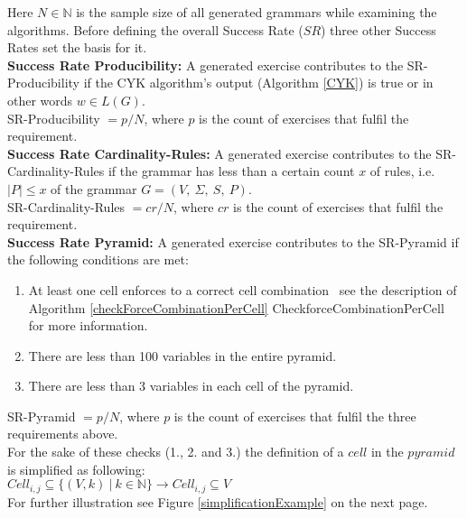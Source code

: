 \noindent Here $N \in  \mathbb{N}$ is the sample size of all generated grammars while examining the algorithms. Before defining the overall Success Rate ($SR$) three other Success Rates set the basis for it.\\

\noindent\textbf{Success Rate Producibility: }
A generated exercise contributes to the SR-Producibility if the CYK algorithm's output (Algorithm \ref{CYK}) is true or in other words $w\in L(G)$.\\
SR-Producibility $ = p / N$, where $p$ is the count of exercises that fulfil the requirement.\\

\noindent\textbf{Success Rate Cardinality-Rules: }
A generated exercise contributes to the SR-Cardinality-Rules if the grammar has less than a certain count $x$ of rules, i.e. $|P|\leq x$ of the grammar $G=(V,\ \Sigma,\ S,\ P)$.\\
SR-Cardinality-Rules $ = cr / N$, where $cr$ is the count of exercises that fulfil the requirement.\\

\noindent\textbf{Success Rate Pyramid: }
A generated exercise contributes to the SR-Pyramid if the following conditions are met:
\begin{enumerate} [noitemsep]
	\item At least one cell enforces to a correct cell combination \textendash~see the description of Algorithm \ref{checkForceCombinationPerCell} CheckforceCombinationPerCell for more information.
	\item There are less than 100 variables in the entire pyramid.
	\item There are less than 3 variables in each cell of the pyramid.
\end{enumerate}
SR-Pyramid $= p / N$, where $p$ is the count of exercises that fulfil the three requirements above. \\

\noindent For the sake of these checks (1., 2. and 3.) the definition of a $cell$ in the $pyramid$ is simplified as following:\\ 
$Cell_{i,j} \subseteq \{(V,k)~|~k \in \mathbb{N} \} \longrightarrow Cell_{i,j} \subseteq V$\\
For further illustration see Figure \ref{simplificationExample} on the next page. 
\clearpage

